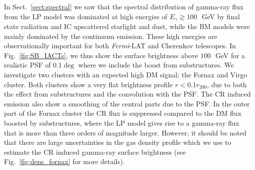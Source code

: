 \documentclass[10pt,aps,pra,reprint,amsmath,amsfonts,amssymb,showpacs,nofootinbib,floatfix]{revtex4-1}
\newcommand{\Fermi}{{\em Fermi}\xspace}
\newcommand{\rvir}{r_{200}}
\begin{document}
In Sect.~\ref{sect:spectral} we saw that the spectral distribution of
gamma-ray flux from the LP model was dominated at high energies of
$E_\gamma\gtrsim 100\,$~GeV by final state radiation and IC upscattered
starlight and dust, while the BM models were mainly dominated by the
continuum emission. These high energies are observationally important
for both \Fermi-LAT and Cherenkov telescopes. In
Fig.~\ref{fig:SB_IACTs}, we thus show the surface brightness above
$100\,$~GeV for a realistic PSF of $0.1\deg$ where we include the
boost from substructures. We investigate two clusters with an expected
high DM signal; the Fornax and Virgo cluster. Both clusters show a
very flat brightness profile $r<0.1\rvir$, due to both the effect from
substructures and the convolution with the PSF. The CR induced emission
also show a smoothing of the central parts due to the PSF. In the
outer part of the Fornax cluster the CR flux is suppressed compared to
the DM flux boosted by substructures, where the LP model gives rise to
a gamma-ray flux that is more than three orders of magnitude
larger. However, it should be noted that there are large uncertainties
in the gas density profile which we use to estimate the CR induced
gamma-ray surface brightness (see Fig.~\ref{fig:dens_fornax} for more
details).
\end{document}
